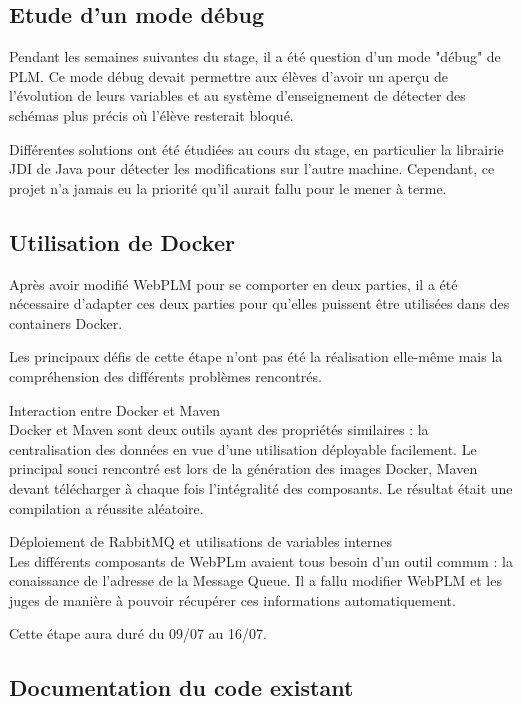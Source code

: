\documentclass[stage]{tnreport}
\begin{document}
\subsection{Etude d'un mode débug}

Pendant les semaines suivantes du stage, il a été question d'un mode "débug" de PLM. Ce mode débug devait permettre aux élèves d'avoir un aperçu de l'évolution de leurs variables et au système d'enseignement de détecter des schémas plus précis où l'élève resterait bloqué.

Différentes solutions ont été étudiées au cours du stage, en particulier la librairie JDI de Java pour détecter les modifications sur l'autre machine. Cependant, ce projet n'a jamais eu la priorité qu'il aurait fallu pour le mener à terme.

\subsection{Utilisation de Docker}

Après avoir modifié WebPLM pour se comporter en deux parties, il a été nécessaire d'adapter ces deux parties pour qu'elles puissent être utilisées dans des containers Docker.

Les principaux défis de cette étape n'ont pas été la réalisation elle-même mais la compréhension des différents problèmes rencontrés.

\begin{description}
	\item{Interaction entre Docker et Maven} \hfill \\
		Docker et Maven sont deux outils ayant des propriétés similaires : la centralisation des données en vue d'une utilisation déployable facilement. Le principal souci rencontré est lors de la génération des images Docker, Maven devant télécharger à chaque fois l'intégralité des composants. Le résultat était une compilation a réussite aléatoire.
	\item{Déploiement de RabbitMQ et utilisations de variables internes} \hfill \\
		Les différents composants de WebPLm avaient tous besoin d'un outil commun : la conaissance de l'adresse de la Message Queue. Il a fallu modifier WebPLM et les juges de manière à pouvoir récupérer ces informations automatiquement.
\end{description}

Cette étape aura duré du 09/07 au 16/07.

\subsection{Documentation du code existant}
\end{document}
